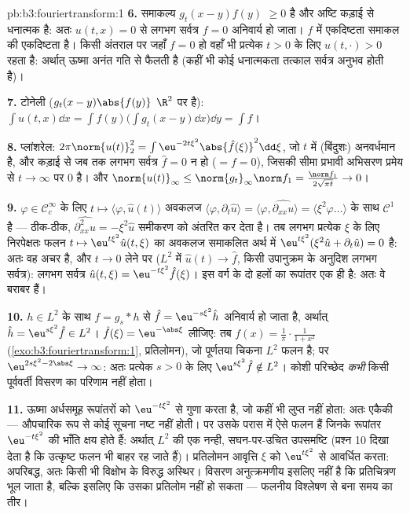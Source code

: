 \begin{solution}{pb:b3:fouriertransform:1}
\textbf{6.} समाकल्य $g_t(x-y)f(y)$ $\geq 0$ है और अष्टि कड़ाई से धनात्मक है: अतः
$u(t,x) = 0$ से लगभग सर्वत्र $f = 0$ अनिवार्य हो जाता। $f$ में एकदिष्टता
समाकल की एकदिष्टता है। किसी अंतराल पर जहाँ $f = 0$ हो वहाँ भी प्रत्येक
$t > 0$ के लिए $u(t, \cdot) > 0$ रहता है: अर्थात् ऊष्मा अनंत गति से फैलती है (कहीं
भी कोई धनात्मकता तत्काल सर्वत्र अनुभव होती है)।

\textbf{7.} टोनेली ($g_t(x-y)\abs{f(y)}$ $\R^2$ पर  है): $\int u(t,x)\dd x = \int f(y)\bigl(\int g_t(x -
y)\dd x\bigr)\dd y = \int f$।

\textbf{8.} प्लांशरेल: $2\pi\norm{u(t)}_2^2 =
\int\eu^{-2t\xi^2}\abs{\hat f(\xi)}^2\dd\xi$, जो $t$ में (बिंदुशः) अनवर्धमान है,
और कड़ाई से जब तक लगभग सर्वत्र $\hat f = 0$ न हो ($= f =
0$), जिसकी सीमा प्रभावी
अभिसरण प्रमेय से $t\to\infty$ पर $0$ है। और $\norm{u(t)}_\infty \leq \norm{g_t}_\infty\norm f_1 =
\frac{\norm f_1}{2\sqrt{\pi t}} \to 0$।

\textbf{9.} $\varphi \in \mathcal C_c^\infty$ के लिए $t \mapsto
\langle\varphi, \hat u(t)\rangle$ अवकलज $\langle\varphi, \partial_t\hat u\rangle =
\langle\varphi, \widehat{\partial_{xx}u}\rangle =
\langle\xi^2\varphi\dots\rangle$ के साथ $\mathcal C^1$ है ---
ठीक-ठीक, $\widehat{\partial^2_{xx}u} = -\xi^2\hat u$ समीकरण को अंतरित कर देता है। तब लगभग प्रत्येक $\xi$
के लिए निरपेक्षतः  फलन $t \mapsto \eu^{t\xi^2}\hat u(t,\xi)$ का अवकलज समाकलित अर्थ में $\eu^{t\xi^2}(\xi^2\hat u + \partial_t\hat u) = 0$ है:
अतः वह अचर है, और $t \to 0$ लेने पर ($L^2$ में $\hat u(t) \to \hat f$, किसी उपानुक्रम के
अनुदिश लगभग सर्वत्र): लगभग सर्वत्र $\hat u(t, \xi) = \eu^{-t\xi^2}\hat f(\xi)$। इस वर्ग के दो हलों का
रूपांतर एक ही है: अतः वे बराबर हैं।

\textbf{10.} $h \in L^2$ के साथ $f = g_s * h$ से $\hat f =
\eu^{-s\xi^2}\hat h$ अनिवार्य हो जाता है, अर्थात्
$\hat h = \eu^{s\xi^2}\hat f \in
L^2$। $\hat f(\xi) = \eu^{-\abs\xi}$ लीजिए: तब $f(x) =
\frac1\pi\cdot\frac1{1 + x^2}$ (\cref{exo:b3:fouriertransform:1}, प्रतिलोमन), जो पूर्णतया चिकना
$L^2$ फलन है; पर $\eu^{2s\xi^2 - 2\abs\xi} \to
\infty$: अतः प्रत्येक $s > 0$ के लिए $\eu^{s\xi^2}\hat f \notin L^2$। कोशी परिच्छेद
\emph{कभी} किसी पूर्ववर्ती विसरण का परिणाम नहीं होता।

\textbf{11.} ऊष्मा अर्धसमूह रूपांतरों को $\eu^{-t\xi^2}$ से गुणा करता है, जो
कहीं भी लुप्त नहीं होता: अतः एकैकी --- औपचारिक रूप से कोई सूचना नष्ट
नहीं होती। पर उसके परास में ऐसे फलन हैं जिनके रूपांतर $\eu^{-t\xi^2}$ की भाँति
क्षय होते हैं: अर्थात् $L^2$ की एक नन्ही, सघन-पर-उचित उपसमष्टि (प्रश्न
10 दिखा देता है कि उत्कृष्ट फलन भी बाहर रह जाते हैं)। प्रतिलोमन
आवृत्ति $\xi$ को $\eu^{t\xi^2}$ से आवर्धित करता: अपरिबद्ध, अतः किसी भी विक्षोभ
के विरुद्ध अस्थिर। विसरण अनुत्क्रमणीय इसलिए नहीं है कि प्रतिचित्रण
भूल जाता है, बल्कि इसलिए कि उसका प्रतिलोम  नहीं हो सकता ---
फलनीय विश्लेषण से बना समय का तीर।


\end{solution}
